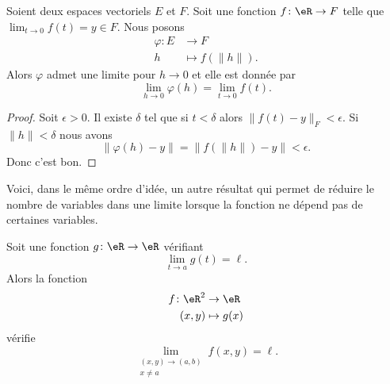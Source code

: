 \begin{lemma}
	Soient deux espaces vectoriels \( E\) et \( F\). Soit une fonction \( f\colon \eR\to F\) telle que \( \lim_{t\to 0} f(t)=y\in F\). Nous posons
	\begin{equation}
		\begin{aligned}
			\varphi\colon E & \to F               \\
			h               & \mapsto f(\| h \|).
		\end{aligned}
	\end{equation}
	Alors \( \varphi\) admet une limite pour \( h\to 0\) et elle est donnée par
	\begin{equation}
		\lim_{h\to 0} \varphi(h)=\lim_{t\to 0} f(t).
	\end{equation}
\end{lemma}

\begin{proof}
	Soit \( \epsilon>0\). Il existe \( \delta\) tel que si \( t<\delta\) alors \( \| f(t)-y \|_F<\epsilon\). Si \( \| h \|<\delta\) nous avons
	\begin{equation}
		\| \varphi(h)-y \|=\| f(\| h \|)-y \|<\epsilon.
	\end{equation}
	Donc c'est bon.
\end{proof}

Voici, dans le même ordre d'idée, un autre résultat qui permet de réduire le nombre de variables dans une limite lorsque la fonction ne dépend pas de certaines variables.

\begin{lemma}        \label{LEMooYLIHooFBQyzC}
	Soit une fonction \( g\colon \eR\to \eR\) vérifiant
	\begin{equation}
		\lim_{t\to a} g(t)=\ell.
	\end{equation}
	Alors la fonction
	\begin{equation}
		\begin{aligned}
			f\colon \eR^2 & \to \eR      \\
			(x,y)         & \mapsto g(x)
		\end{aligned}
	\end{equation}
	vérifie
	\begin{equation}
		\lim_{\substack{(x,y)\to(a,b)\\x\neq a}} f(x,y)=\ell.
	\end{equation}
\end{lemma}

